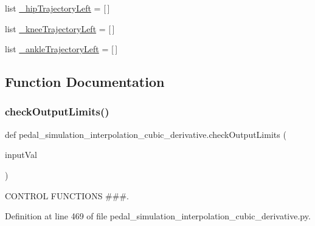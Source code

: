 \begin{DoxyCompactItemize}
\item 
list \mbox{\hyperlink{namespacepedal__simulation__interpolation__cubic__derivative_a65edc5212dc70634c0cf8a16fbe1ba9a}{\+\_\+hip\+Trajectory\+Left}} = \mbox{[}$\,$\mbox{]}
\item 
list \mbox{\hyperlink{namespacepedal__simulation__interpolation__cubic__derivative_a6524f7e52a09b325a00e98b860666f7b}{\+\_\+knee\+Trajectory\+Left}} = \mbox{[}$\,$\mbox{]}
\item 
list \mbox{\hyperlink{namespacepedal__simulation__interpolation__cubic__derivative_aa24a6508fd81e17faaf36ef2f5f28ffb}{\+\_\+ankle\+Trajectory\+Left}} = \mbox{[}$\,$\mbox{]}
\end{DoxyCompactItemize}


\subsection{Function Documentation}
\mbox{\label{namespacepedal__simulation__interpolation__cubic__derivative_a3ddde17d9f15cda662ed533aeee486b2}} 
\subsubsection{\texorpdfstring{checkOutputLimits()}{checkOutputLimits()}}
{\footnotesize\ttfamily def pedal\+\_\+simulation\+\_\+interpolation\+\_\+cubic\+\_\+derivative.\+check\+Output\+Limits (\begin{DoxyParamCaption}\item[{}]{input\+Val }\end{DoxyParamCaption})}



C\+O\+N\+T\+R\+OL F\+U\+N\+C\+T\+I\+O\+NS \#\#\#. 



Definition at line 469 of file pedal\+\_\+simulation\+\_\+interpolation\+\_\+cubic\+\_\+derivative.\+py.


